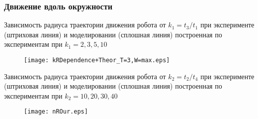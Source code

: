 \begin{frame}
\frametitle{Движение вдоль окружности}

Зависимость радиуса траектории движения робота от $k_1 ={t_3}/{t_1}$ при эксперименте (штриховая линия) и моделировании (сплошная линия) построенная по экспериментам при $k_1 = 2, 3, 5, 10$

\begin{figure}[!ht]
	\centering
	\texttt{[image: kRDependence+Theor\_T=3,W=max.eps]}
\end{figure}
	
Зависимость радиуса траектории движения робота от $k_2 = {t_2}/{t_4}$ при эксперименте (штриховая линия) и моделировании (сплошная линия) построенная по экспериментам при $k_2 = 10, 20, 30, 40$

\begin{figure}[!ht]
	\centering
	\texttt{[image: nROur.eps]}
\end{figure}		

\end{frame}


